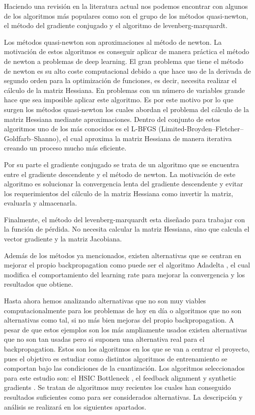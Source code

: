 Haciendo una revisión en la literatura actual nos podemos encontrar con algunos de los algoritmos más populares como son el grupo de los métodos quasi-newton, el método del gradiente conjugado\cite{RefWorks:RefID:13-johansson1991backpropagation} y el algoritmo de levenberg-marquardt\cite{yu2011levenberg}.

Los métodos quasi-newton son aproximaciones al método de newton. La motivación de estos algoritmos es conseguir aplicar de manera práctica el método de newton a problemas de deep learning. El gran problema que tiene el método de newton es su alto coste computacional debido a que hace uso de la derivada de segundo orden para la optimización de funciones, es decir, necesita realizar el cálculo de la matriz Hessiana. En problemas con un número de variables grande hace que sea imposible aplicar este algoritmo. Es por este motivo por lo que surgen los métodos quasi-newton los cuales abordan el problema del cálculo de la matriz Hessiana mediante aproximaciones. Dentro del conjunto de estos algoritmos uno de los más conocidos es el L-BFGS \cite{RefWorks:RefID:12-rafati2018improving} (Limited-Broyden–Fletcher–Goldfarb–Shanno), el cual aproxima la matriz Hessiana de manera iterativa creando un proceso mucho más eficiente. 

Por su parte el gradiente conjugado  se trata de un algoritmo que se encuentra entre el gradiente descendente y el método de newton. La motivación de este algoritmo es solucionar la convergencia lenta del gradiente descendente y evitar los requerimientos del cálculo de la matriz Hessiana como invertir la matriz, evaluarla y almacenarla. 

Finalmente, el método del levenberg-marquardt esta diseñado para trabajar con la función de pérdida. No necesita calcular la matriz Hessiana, sino que calcula el vector gradiente y la matriz Jacobiana.

Además de los métodos ya mencionados, existen alternativas que se centran en mejorar el propio backpropagation como puede ser el algoritmo Adadelta \cite{https://doi.org/10.48550/arxiv.1212.5701}, el cual modifica el comportamiento del learning rate para mejorar la convergencia y los resultados que obtiene. 

Hasta ahora hemos analizando alternativas que no son muy viables computacionalmente para los problemas de hoy en día o algoritmos que no son alternativas como tal, si no más bien mejoras del propio backpropagation. A pesar de que estos ejemplos son los más ampliamente usados existen alternativas que no son tan usadas pero si suponen una alternativa real para el backpropagation. Estos son los algoritmos en los que se van a centrar el proyecto, pues el objetivo es estudiar como distintos algoritmos de entrenamiento se comportan bajo las condiciones de la cuantización. Los algoritmos seleccionados para este estudio son:  el HSIC Bottleneck \cite{ma2020hsic}, el feedback alignment \cite{RefWorks:RefID:9-lillicrap2016random} y synthetic gradients \cite{jaderberg2017decoupled}. Se tratan de algoritmos muy recientes los cuales han conseguido resultados suficientes como para ser considerados alternativas. La descripción y análisis se realizará en los siguientes apartados.  

